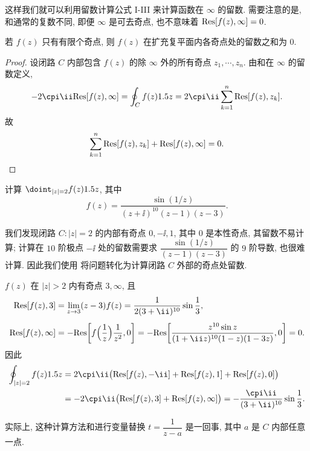 这样我们就可以利用留数计算公式 I-III 来计算函数在 $\infty$ 的留数.
需要注意的是, 和通常的复数不同, \alert{即便 $\infty$ 是可去奇点, 也不意味着 ${\mathrm{Res}}[f(z),\infty]=0$}.

\begin{theorem}\label{thm:sum-of-residues-are-zero}
  若 $f(z)$ 只有有限个奇点, 则 $f(z)$ 在扩充复平面内各奇点处的留数之和为 $0$.
\end{theorem}

\begin{proof}
  设闭路 $C$ 内部包含 $f(z)$ 的除 $\infty$ 外的所有奇点 $z_1,\cdots,z_n$.
  由\thmRes 和在 $\infty$ 的留数定义, 
  \[
     -2\cpi\ii\Res[f(z),\infty]
    =\oint_C f(z)\d z
    =2\cpi\ii\sum_{k=1}^n\Res[f(z),z_k].
  \]
  故
  \[
    \sum_{k=1}^n {\mathrm{Res}}[f(z),z_k]+{\mathrm{Res}}[f(z),\infty]=0.\qedhere
  \]
\end{proof}

\begin{example}
  计算 $\doint_{|z|=2}f(z)\d z$, 其中
  \[
    f(z)=\frac{\sin(1/z)}{(z+\ii)^{10}(z-1)(z-3)}.
  \]
\end{example}

我们发现闭路 $C:|z|=2$ 的内部有奇点 $0,-\ii,1$, 其中 $0$ 是本性奇点, 其留数不易计算; 计算在 $10$ 阶极点 $-\ii$ 处的留数需要求 $\dfrac{\sin(1/z)}{(z-1)(z-3)}$ 的 $9$ 阶导数, 也很难计算.
因此我们使用 将问题转化为计算闭路 $C$ 外部的奇点处留数.

\begin{solution}
  $f(z)$ 在 $|z|>2$ 内有奇点 $3,\infty$, 且
  \begin{align*}
     \Res[f(z),3]&
    =\lim_{z\ra3}(z-3)f(z)
    =\frac1{2(3+\ii)^{10}}\sin\frac13,\\[4pt]
     \Res[f(z),\infty]&
    =-\Res\biggl[f\Bigl(\frac1z\Bigr)\frac1{z^2},0\biggr]
    =-\Res\biggl[\frac{z^{10}\sin z}{(1+\ii z)^{10}(1-z)(1-3z)},0\biggr]
    =0.
  \end{align*}
  因此
  \begin{align*}
     \oint_{|z|=2}f(z)\d z&
    =2\cpi\ii\bigl(\Res[f(z),-\ii]+\Res[f(z),1]+\Res[f(z),0]\bigr)\\&
    =-2\cpi\ii\bigl(\Res[f(z),3]+\Res[f(z),\infty]\bigr)
    =-\frac{\cpi\ii}{(3+\ii)^{10}}\sin\frac13.
  \end{align*}
\end{solution}

实际上, 这种计算方法和进行变量替换 $t=\dfrac1{z-a}$ 是一回事, 其中 $a$ 是 $C$ 内部任意一点.

